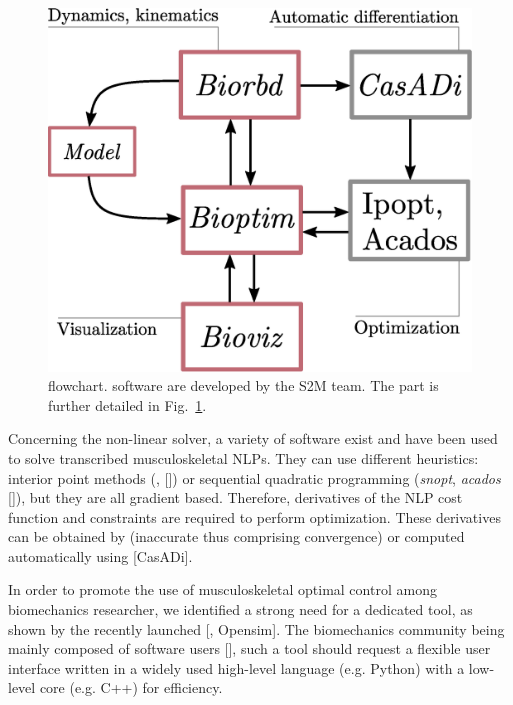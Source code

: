 \begin{figure}[t!]
\centering
\includegraphics[width=0.9\columnwidth]{figures/dependencies.eps}
\caption{\bioptim {} flowchart.  software are developed by the S2M team. The \bioptim part is further detailed in Fig.~\ref{fig:dependencies}.}
\label{fig:dependencies}
\vspace*{-0.5cm}
\end{figure}

Concerning the non-linear solver, a variety of software exist and have been used to solve transcribed musculoskeletal NLPs.
They can use different heuristics: interior point methods (\textit{}, [\addref]) or sequential quadratic programming (\textit{snopt}, \textit{acados} [\addref]), but they are all gradient based.
Therefore, derivatives of the NLP cost function and constraints are required to perform optimization.
These derivatives can be obtained by  (inaccurate thus comprising convergence) or computed automatically using  [CasADi].


In order to promote the use of musculoskeletal optimal control among biomechanics researcher, we identified a strong need for a dedicated tool, as shown by the recently launched  [\addref, Opensim]. 
The biomechanics community being mainly composed of software users [\addref], such a tool should request a flexible user interface written in a widely used high-level language (e.g. Python) with a low-level core (e.g. C++) for efficiency. 


